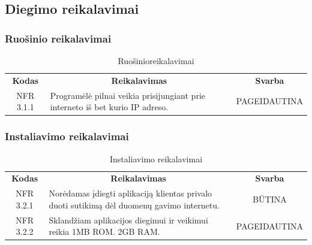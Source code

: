 \documentclass{VUMIFPSkursinis}
\begin{document}
\pagebreak

\subsection{Diegimo reikalavimai}

\subsubsection{Ruošinio reikalavimai}
\begin{center}
	\begin{table}[H]
	\caption{Ruošinioreikalavimai}
	\begin{tabular}{|p{2cm}|p{}|p{}|}
	\hline
	    \rowcolor{lightgray}
		\multicolumn{3}{|c|}{Ruošinio reikalavimai}\\
		
	\hline
		\multicolumn{1}{|c|}{{\bfseries Kodas}}&
		\multicolumn{1}{|c|}{{\bfseries Reikalavimas}}&
		\multicolumn{1}{|c|}{{\bfseries Svarba}}\\
	\hline 	
		\multicolumn{1}{|c|}{NFR 3.1.1}&
		{Programėlė pilnai veikia prisijungiant prie interneto iš bet kurio IP adreso.}&
		\multicolumn{1}{|p{1.5cm}|}{PAGEIDAUTINA}\\	
	
	\hline
	
	
	\end{tabular}
	
	\label{table:Ruošinioreikalavimai}
	\end{table}

\end{center}

\subsubsection{Instaliavimo reikalavimai }
\begin{center}
	\begin{table}[H]
	\caption{Instaliavimo reikalavimai}
	\begin{tabular}{|p{2cm}|p{}|p{}|}
	\hline
	    \rowcolor{lightgray}
		\multicolumn{3}{|c|}{Instaliavimo reikalavimai}\\
		
	\hline
		\multicolumn{1}{|c|}{{\bfseries Kodas}}&
		\multicolumn{1}{|c|}{{\bfseries Reikalavimas}}&
		\multicolumn{1}{|c|}{{\bfseries Svarba}}\\
	\hline 	
		\multicolumn{1}{|c|}{NFR 3.2.1}&
		{Norėdamas įdiegti aplikaciją klientas privalo duoti sutikimą dėl duomenų gavimo internetu.}&
		\multicolumn{1}{|c|}{BŪTINA}\\	
	
	\hline 	
		\multicolumn{1}{|c|}{NFR 3.2.2}&
		{Sklandžiam aplikacijos diegimui ir veikimui reikia 1MB ROM. 2GB RAM.}&
		\multicolumn{1}{|p{1.5cm}|}{PAGEIDAUTINA}\\	
	
	\hline
	
	
	\end{tabular}
	
	\label{table:Instaliavimoreikalavimai}
	\end{table}

\end{center}
\end{document}
